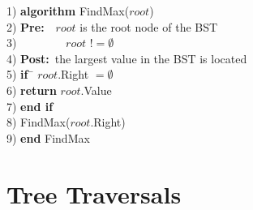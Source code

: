 \begin{tabbing}
1)  \textbf{alg}\= \textbf{orithm} FindMax($root$) \\
2)  \> \textbf{Pre:}~~$root$ is the root node of the BST \\
3)  \> ~~~~~~~~$root$ $!= \emptyset$ \\
4)  \> \textbf{Post:}~the largest value in the BST is located \\
5)  \> \textbf{if}~\= $root$.Right $= \emptyset$ \\
6)  \> \> \textbf{return} $root$.Value \\
7)  \> \textbf{end if} \\
8)  \> FindMax($root$.Right) \\
9)  \textbf{end} FindMax \\
\end{tabbing}

\section{Tree Traversals}
